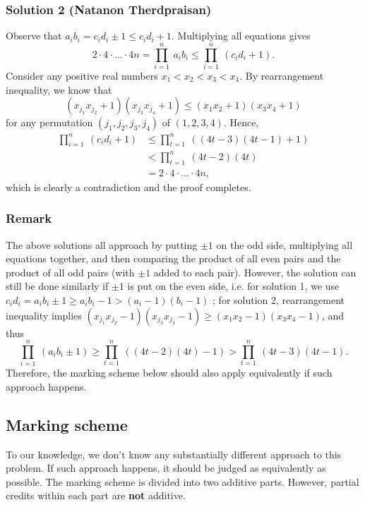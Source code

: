 \subsubsection{Solution 2 (Natanon Therdpraisan)}
Observe that $a_ib_i=c_id_i\pm 1\leq c_id_i+1$. Multiplying all equations gives $$2\cdot 4\cdot \hdots \cdot 4n=\prod_{i=1}^n\ a_ib_i\leq \prod_{i=1}^n\ (c_id_i+1).$$
Consider any positive real numbers $x_1<x_2<x_3<x_4$. By rearrangement inequality, we know that $$(x_{j_1}x_{j_2}+1)(x_{j_3}x_{j_4}+1)\leq (x_1x_2+1)(x_3x_4+1)$$ for any permutation $(j_1,j_2,j_3,j_4)$ of $(1,2,3,4)$.
\nl Hence, 
\begin{align*}
    \prod_{i=1}^n\ (c_id_i+1)&\leq \prod_{t=1}^n\ ((4t-3)(4t-1)+1) \\
    &< \prod_{t=1}^n\ (4t-2)(4t) \\
    &= 2\cdot 4 \cdot \hdots \cdot 4n,
\end{align*} which is clearly a contradiction and the proof completes.

\subsubsection{Remark}
The above solutions all approach by putting $\pm 1$ on the odd side, multiplying all equations together, and then comparing the product of all even pairs and the product of all odd pairs (with $\pm1$ added to each pair). However, the solution can still be done similarly if $\pm 1$ is put on the even side, i.e. 
\nl for solution 1, we use $c_id_i=a_ib_i\pm 1\geq a_ib_i-1>(a_i-1)(b_i-1)$ ;
\nl for solution 2, rearrangement inequality implies $(x_{j_1}x_{j_2}-1)(x_{j_3}x_{j_4}-1)\geq (x_1x_2-1)(x_3x_4-1)$, and thus $$\prod_{i=1}^n\ (a_ib_i\pm 1)\geq \prod_{t=1}^n\ ((4t-2)(4t)-1)>\prod_{t=1}^n\ (4t-3)(4t-1).$$
\nl Therefore, the marking scheme below should also apply equivalently if such approach happens.



\subsection{Marking scheme}
To our knowledge, we don’t know any substantially different approach to this problem. If such approach happens, it should be judged as equivalently as possible. The marking scheme is divided into two additive parts. However, partial credits within each part are \textbf{not} additive.

